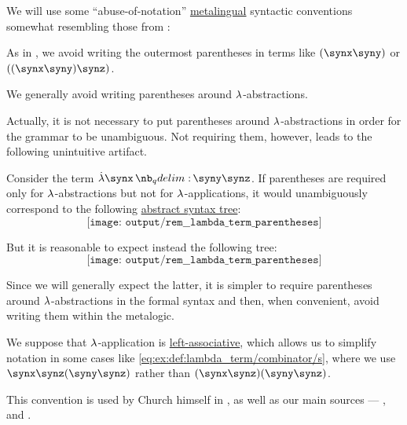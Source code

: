 \begin{remark}\label{rem:lambda_term_parentheses}
  We will use some \enquote{abuse-of-notation} \hyperref[con:metalogic]{metalingual} syntactic conventions somewhat resembling those from :
  \begin{thmenum}
     As in , we avoid writing the outermost parentheses in terms like \( (\synx \syny) \) or \( ((\synx \syny) \synz) \).

     We generally avoid writing parentheses around \( {\mathrm \lambda} \)-abstractions.

    Actually, it is not necessary to put parentheses around \( {\mathrm \lambda} \)-abstractions in order for the grammar to be unambiguous. Not requiring them, however, leads to the following unintuitive artifact.

    Consider the term \( \qabs \synx \syny \synz \). If parentheses are required only for \( {\mathrm \lambda} \)-abstractions but not for \( {\mathrm \lambda} \)-applications, it would unambiguously correspond to the following \hyperref[def:lambda_term_ast]{abstract syntax tree}:
    \begin{equation*}
      \texttt{[image: output/rem\_\_lambda\_term\_parentheses]}
    \end{equation*}

    But it is reasonable to expect instead the following tree:
    \begin{equation*}
      \texttt{[image: output/rem\_\_lambda\_term\_parentheses]}
    \end{equation*}

    Since we will generally expect the latter, it is simpler to require parentheses around \( {\mathrm \lambda} \)-abstractions in the formal syntax and then, when convenient, avoid writing them within the metalogic.

     We suppose that \( {\mathrm \lambda} \)-application is \hyperref[rem:binary_operation_syntax_trees/associativity]{left-associative}, which allows us to simplify notation in some cases like \eqref{eq:ex:def:lambda_term/combinator/s}, where we use \( \synx \synz (\syny \synz) \) rather than \( (\synx \synz)(\syny \synz) \).

    This convention is used by Church himself in , as well as our main sources --- ,  and .
  \end{thmenum}
\end{remark}

